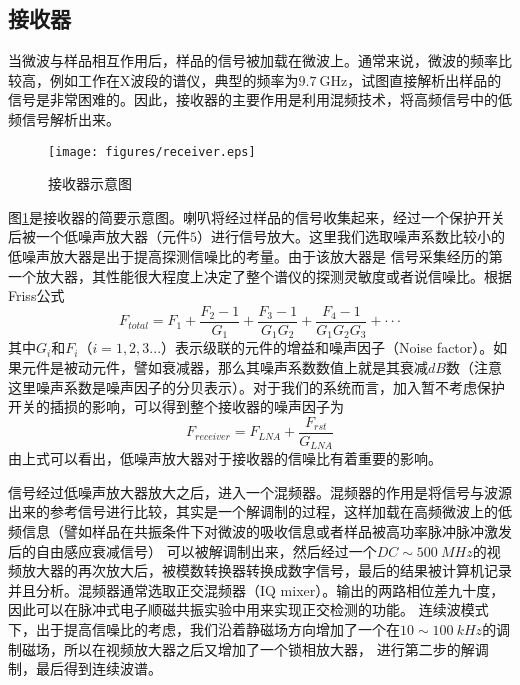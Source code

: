         \subsection{接收器}
        当微波与样品相互作用后，样品的信号被加载在微波上。通常来说，微波的频率比较高，例如工作在X波段的谱仪，典型的频率为$9.7~$GHz，试图直接解析出样品的信号是非常困难的。因此，接收器的主要作用是利用混频技术，将高频信号中的低频信号解析出来。
            \begin{figure}[htbp]
                \begin{center}
                    \texttt{[image: figures/receiver.eps]}
                    \caption{接收器示意图
                    }
                    \label{receiver}
                \end{center}
            \end{figure}
        图\ref{receiver}是接收器的简要示意图。喇叭将经过样品的信号收集起来，经过一个保护开关后被一个低噪声放大器（元件$5$）进行信号放大。这里我们选取噪声系数比较小的低噪声放大器是出于提高探测信噪比的考量。由于该放大器是
        信号采集经历的第一个放大器，其性能很大程度上决定了整个谱仪的探测灵敏度或者说信噪比。根据Friss公式
            \begin{equation}
            \label{Friss-equation}
            F_{total} = F_1 + \frac{F_2 - 1}{G_1} + \frac{F_3-1}{G_1G_2} + \frac{F_4 - 1}{G_1G_2G_3} +  \cdot\cdot\cdot
            \end{equation}
        其中$G_{i}$和$F_{i}$（$i=1,2,3...$）表示级联的元件的增益和噪声因子（Noise factor）。如果元件是被动元件，譬如衰减器，那么其噪声系数数值上就是其衰减$dB$数（注意这里噪声系数是噪声因子的分贝表示）。对于我们的系统而言，加入暂不考虑保护开关的插损的影响，可以得到整个接收器的噪声因子为
            \begin{equation}
            \label{receiver-noise}
            F_{receiver} = F_{LNA}+ \frac{F_{rst}}{G_{LNA}}
            \end{equation}
        由上式可以看出，低噪声放大器对于接收器的信噪比有着重要的影响。

        信号经过低噪声放大器放大之后，进入一个混频器。混频器的作用是将信号与波源出来的参考信号进行比较，其实是一个解调制的过程，这样加载在高频微波上的低频信息（譬如样品在共振条件下对微波的吸收信息或者样品被高功率脉冲脉冲激发后的自由感应衰减信号）
        可以被解调制出来，然后经过一个$DC\sim500~MHz$的视频放大器的再次放大后，被模数转换器转换成数字信号，最后的结果被计算机记录并且分析。混频器通常选取正交混频器（IQ mixer）。输出的两路相位差九十度，因此可以在脉冲式电子顺磁共振实验中用来实现正交检测的功能。
        连续波模式下，出于提高信噪比的考虑，我们沿着静磁场方向增加了一个在$10\sim100~kHz$的调制磁场，所以在视频放大器之后又增加了一个锁相放大器，
        进行第二步的解调制，最后得到连续波谱。
